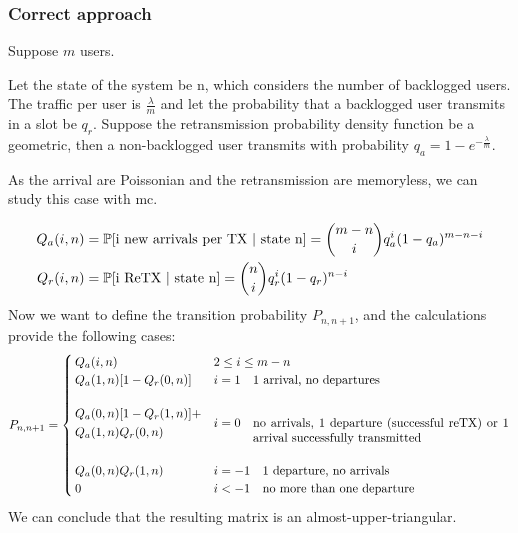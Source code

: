\subsubsection{Correct approach}

Suppose $m$ users.

Let the state of the system be n, which considers the number of backlogged users.
The traffic per user is $\frac{\lambda}{m}$ and let the probability that a backlogged user transmits in a slot be $q_r$. Suppose the retransmission probability density function be a geometric, then a non-backlogged user transmits with probability $q_a = 1-e^{-\frac{\lambda}{m}}$.

As the arrival are Poissonian and the retransmission are memoryless, we can study this case with \gls{mc}.

\begin{equation}\begin{split}
	Q_a(i,n) &= \mathbb{P}[\text{i new arrivals per TX | state n}] = \binom{m-n}{i} q_a^i (1-q_a)^{m-n-i} \\
	Q_r(i,n) &= \mathbb{P}[\text{i ReTX | state n}] = \binom{n}{i} q_r^i (1-q_r)^{n-i} \\
\end{split}\end{equation}
Now we want to define the transition probability $P_{n,n+1}$, and the calculations provide the following cases:
\begin{equation}
	P_{n,n+1} = \begin{cases}
	 Q_a(i,n) & 2 \le i \le m-n \\
	 Q_a(1,n) [1-Q_r(0,n)] & i=1 \quad \text{1 arrival, no departures}\\\\
	 \begin{aligned}
	 & Q_a(0,n) [1-Q_r(1,n)] + \\ & Q_a(1,n) Q_r(0,n)
	 \end{aligned}& i=0 \quad \parbox[t]{0.6\textwidth}{no arrivals, 1 departure (successful reTX) or 1 arrival successfully transmitted }\\\\
	 Q_a(0,n) Q_r(1,n) & i = -1 \quad \text{1 departure, no arrivals}\\
	 0 & i < -1 \quad \text{no more than one departure}
	\end{cases}
\end{equation}
We can conclude that the resulting matrix is an almost-upper-triangular.

